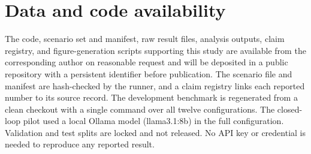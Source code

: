 \documentclass[3p,twocolumn]{elsarticle}
\newcommand{\pilotModel}{llama3.1:8b}
\begin{document}
\section*{Data and code availability}
\begingroup\raggedright\sloppy
The code, scenario set and manifest, raw result files, analysis outputs, claim registry, and figure-generation scripts supporting this study are available from the corresponding author on reasonable request and will be deposited in a public repository with a persistent identifier before publication. The scenario file and manifest are hash-checked by the runner, and a claim registry links each reported number to its source record. The development benchmark is regenerated from a clean checkout with a single command over all twelve configurations. The closed-loop pilot used a local Ollama model (\pilotModel) in the full configuration. Validation and test splits are locked and not released. No API key or credential is needed to reproduce any reported result.
\endgroup



\end{document}
